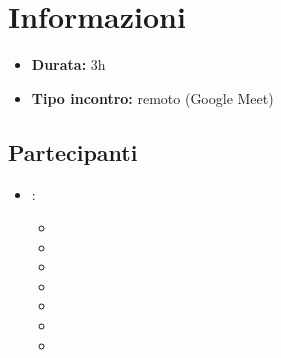 \section{Informazioni}
\begin{itemize}
	\item \textbf{Durata:} 3h
	\item \textbf{Tipo incontro:} remoto (Google Meet)
\end{itemize}

\subsection{Partecipanti}

\begin{itemize}
	\item \GroupName:
	\begin{itemize}
		\item \tommaso
		\item \marco
		\item \raul
		\item \sebastiano
		\item \mattia
		\item \martina
		\item \riccardo
	\end{itemize}
\end{itemize}

\clearpage
